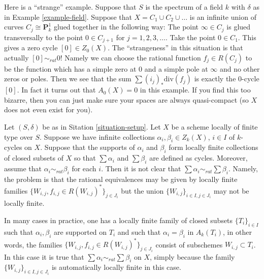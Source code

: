 \begin{example}
\label{example-weird}
Here is a ``strange'' example.
Suppose that $S$ is the spectrum of a field $k$
with $\delta$ as in Example \ref{example-field}.
Suppose that $X = C_1 \cup C_2 \cup \ldots$ is an infinite
union of curves $C_j \cong \mathbf{P}^1_k$ glued together
in the following way: The point $\infty \in C_j$ is glued
transversally to the point $0 \in C_{j + 1}$ for $j = 1, 2, 3, \ldots$.
Take the point $0 \in C_1$. This gives a zero cycle
$[0] \in Z_0(X)$. The ``strangeness'' in this situation is
that actually $[0] \sim_{rat} 0$! Namely we can choose
the rational function $f_j \in R(C_j)$ to be the function
which has a simple zero at $0$ and a simple pole at $\infty$
and no other zeros or poles. Then we see that the sum
$\sum (i_j)_*\text{div}(f_j)$ is exactly the $0$-cycle
$[0]$. In fact it turns out that $A_0(X) = 0$ in this example.
If you find this too bizarre, then you can just
make sure your spaces are always quasi-compact
(so $X$ does not even exist for you).
\end{example}

\begin{remark}
\label{remark-infinite-sums-rational-equivalences}
Let $(S, \delta)$ be as in Sitation \ref{situation-setup}.
Let $X$ be a scheme locally of finite type over $S$.
Suppose we have infinite collections $\alpha_i, \beta_i \in Z_k(X)$,
$i \in I$ of $k$-cycles on $X$. Suppose that the supports
of $\alpha_i$ and $\beta_i$ form locally finite collections
of closed subsets of $X$ so that $\sum \alpha_i$
and $\sum \beta_i$ are defined as cycles. Moreover, assume that
$\alpha_i \sim_{rat} \beta_i$ for each $i$. Then it is not
clear that $\sum \alpha_i \sim_{rat} \sum \beta_i$. Namely,
the problem is that the rational equivalences may be
given by locally finite
families $\{W_{i, j}, f_{i, j} \in R(W_{i,j})^*\}_{j \in J_i}$
but the union $\{W_{i, j}\}_{i \in I, j\in J_i}$ may not
be locally finite.

\medskip\noindent
In many cases in practice, one has a locally finite family of closed
subsets $\{T_i\}_{i \in I}$ such that $\alpha_i, \beta_i$
are supported on $T_i$ and such that $\alpha_i = \beta_i$
in $A_k(T_i)$, in other words, the families
$\{W_{i, j}, f_{i, j} \in R(W_{i,j})^*\}_{j \in J_i}$
consist of subschemes $W_{i, j} \subset T_i$. In this case it is true that
$\sum \alpha_i \sim_{rat} \sum \beta_i$ on $X$, simply because
the family $\{W_{i, j}\}_{i \in I, j\in J_i}$ is automatically
locally finite in this case.
\end{remark}







